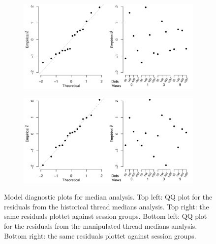 \documentclass[9pt,twoside,lineno]{pnas-new}
\begin{document}
\begin{figure}%
	\begin{subfigure}[b]{.8\textwidth}
		\includegraphics[width=\textwidth]{med_residual_h.pdf}
	\end{subfigure}
	\begin{subfigure}[b]{.8\textwidth}
		\includegraphics[width=\textwidth]{med_residual_m.pdf}	
	\end{subfigure}
	\caption{Model diagnostic plots for median analysis. Top left: QQ plot for the residuals from the historical thread medians analysis. Top right: the same residuals plottet against session groups. Bottom left: QQ plot for the residuals from the manipulated thread medians analysis. Bottom right: the same residuals plottet against session groups.}
	\label{fig: qq plots median}
\end{figure}
\end{document}
